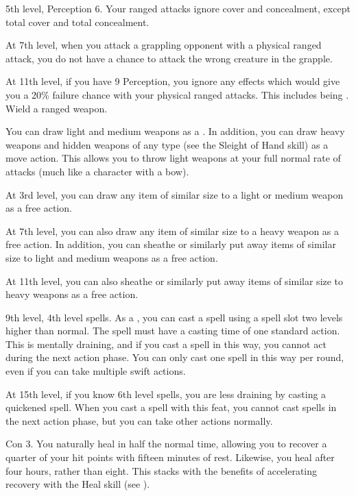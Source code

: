     \featpres 5th level, Perception 6.
    \featben Your ranged attacks ignore cover and concealment, except total cover and total concealment.

    At 7th level, when you attack a grappling opponent with a physical ranged attack, you do not have a chance to attack the wrong creature in the grapple.

    At 11th level, if you have 9 Perception, you ignore any effects which would give you a 20\% failure chance with your physical ranged attacks.
    This includes being \impaired.
    \stylereq Wield a ranged weapon.

    \featben You can draw light and medium weapons as a .
    In addition, you can draw heavy weapons and hidden weapons of any type (see the Sleight of Hand skill) as a move action.
    This allows you to throw light weapons at your full normal rate of attacks (much like a character with a bow).

    At 3rd level, you can draw any item of similar size to a light or medium weapon as a free action.

    At 7th level, you can also draw any item of similar size to a heavy weapon as a free action.
    In addition, you can sheathe or similarly put away items of similar size to light and medium weapons as a free action.

    At 11th level, you can also sheathe or similarly put away items of similar size to heavy weapons as a free action.

    \featpre 9th level, 4th level spells.
    \featben As a , you can cast a spell using a spell slot two levels higher than normal.
    The spell must have a casting time of one standard action.
    This is mentally draining, and if you cast a spell in this way, you cannot act during the next action phase.
    You can only cast one spell in this way per round, even if you can take multiple swift actions.

    At 15th level, if you know 6th level spells, you are less draining by casting a quickened spell.
    When you cast a spell with this feat, you cannot cast spells in the next action phase, but you can take other actions normally.

    \featpre Con 3.
    \featben You naturally heal in half the normal time, allowing you to recover a quarter of your hit points with fifteen minutes of rest.
    Likewise, you heal  after four hours, rather than eight.
    This stacks with the benefits of accelerating recovery with the Heal skill (see ).

